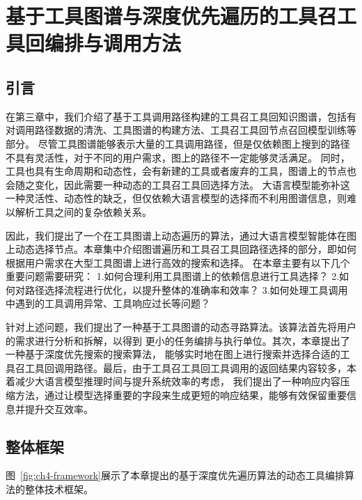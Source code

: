\chapter{基于工具图谱与深度优先遍历的工具召工具回编排与调用方法}

\section{引言}
\label{sec:intro}

\indent 在第三章中，我们介绍了基于工具调用路径构建的工具召工具回知识图谱，包括有对调用路径数据的清洗、工具图谱的构建方法、工具召工具回节点召回模型训练等部分。
尽管工具图谱能够表示大量的工具调用路径，但是仅依赖图上搜到的路径不具有灵活性，对于不同的用户需求，图上的路径不一定能够灵活满足。
同时，工具也具有生命周期和动态性，会有新建的工具或者废弃的工具，图谱上的节点也会随之变化，因此需要一种动态的工具召工具回选择方法。
大语言模型能弥补这一种灵活性、动态性的缺乏，但仅依赖大语言模型的选择而不利用图谱信息，则难以解析工具之间的复杂依赖关系。

因此，我们提出了一个在工具图谱上动态遍历的算法，通过大语言模型智能体在图上动态选择节点。本章集中介绍图谱遍历和工具召工具回路径选择的部分，即如何根据用户需求在大型工具图谱上进行高效的搜索和选择。
在本章主要有以下几个重要问题需要研究：
1.如何合理利用工具图谱上的依赖信息进行工具选择？
2.如何对路径选择流程进行优化，以提升整体的准确率和效率？
3.如何处理工具调用中遇到的工具调用异常、工具响应过长等问题？

\indent 针对上述问题，我们提出了一种基于工具图谱的动态寻路算法。该算法首先将用户的需求进行分析和拆解，以得到
更小的任务编排与执行单位。其次，本章提出了一种基于深度优先搜索的搜索算法，
能够实时地在图上进行搜索并选择合适的工具召工具回调用路径。最后，由于工具召工具回工具调用的返回结果内容较多，本着减少大语言模型推理时间与提升系统效率的考虑，
我们提出了一种响应内容压缩方法，通过让模型选择重要的字段来生成更短的响应结果，能够有效保留重要信息并提升交互效率。

\section{整体框架}

图~\ref{fig:ch4-framework}展示了本章提出的基于深度优先遍历算法的动态工具编排算法的整体技术框架。

